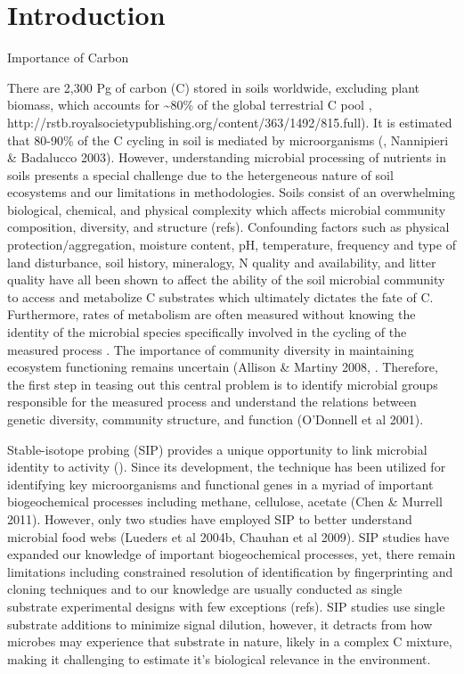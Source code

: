 \section{Introduction} 
Importance of Carbon 

There are 2,300 Pg of carbon (C) stored in soils worldwide, excluding plant biomass, which accounts for \sim80\% of the global terrestrial C pool \cite{Amundson_2001,IPCC 2000,IPCC 2007,elsen_Ayres_Wall_Bardgett_2011,Lal_2008,BATJES_1996}, http://rstb.royalsocietypublishing.org/content/363/1492/815.full). It is estimated that 80-90\% of the C cycling in soil is mediated by microorganisms (\cite{ColemanCrossley_1996}, Nannipieri & Badalucco 2003). However, understanding microbial processing of nutrients in soils presents a special challenge due to the hetergeneous nature of soil ecosystems and our limitations in methodologies. Soils consist of an overwhelming biological, chemical, and physical complexity which affects microbial community composition, diversity, and structure (refs).  Confounding factors such as physical protection/aggregation, moisture content, pH, temperature, frequency and type of land disturbance, soil history, mineralogy, N quality and availability, and litter quality have all been shown to affect the ability of the soil microbial community to access and metabolize C substrates \cite{Schlesinger_1977,dgett_Wall_Hattenschwiler_2010,Sollins_Homann_Caldwell_1996,Torn_Vitousek_Trumbore_2005,TRUMBORE_2006} which ultimately dictates the fate of C. Furthermore, rates of metabolism are often measured without knowing the identity of the microbial species specifically involved in the cycling of the measured process \cite{ndi_Pietramellara_Renella_2003}.  The importance of community diversity in maintaining ecosystem functioning remains uncertain (Allison & Martiny 2008, \cite{ndi_Pietramellara_Renella_2003}. Therefore, the first step in teasing out this central problem is to identify microbial groups responsible for the measured process and understand the relations between genetic diversity, community structure, and function (O’Donnell et al 2001).\par  


Stable-isotope probing (SIP) provides a unique opportunity to link microbial identity to activity (\cite{Chen_Murrell_2010}). Since its development, the technique has been utilized for identifying key microorganisms and functional genes in a myriad of important biogeochemical processes including methane, cellulose, acetate (Chen & Murrell 2011).  However, only two studies have employed SIP to better understand microbial food webs (Lueders et al 2004b, Chauhan et al 2009). SIP studies have expanded our knowledge of important biogeochemical processes, yet, there remain limitations including constrained resolution of identification by fingerprinting and cloning techniques and to our knowledge are usually conducted as single substrate experimental designs with few exceptions (refs).  SIP studies use single substrate additions to minimize signal dilution, however, it detracts from how microbes may experience that substrate in nature, likely in a complex C mixture, making it challenging to estimate it's biological relevance in the environment.

